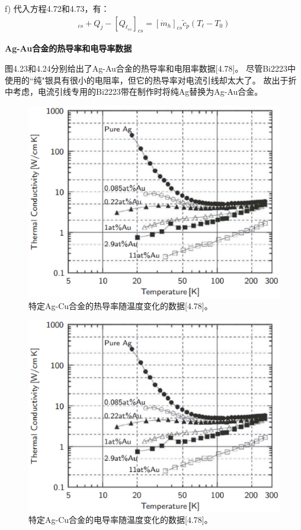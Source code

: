 f) 代入方程4.72和4.73，有：
\begin{align*}%
[Q_\ell]_{cs}+Q_j-[Q_{\ell_{cs}}]_{cs}=[\dot{m}_h]_{cs}\tilde{c}_p(T_\ell-T_0) \tag{4.74}
\end{align*}

\textbf{Ag-Au合金的热导率和电导率数据}

图4.23和4.24分别给出了Ag-Au合金的热导率和电阻率数据[4.78]。
尽管Bi2223中使用的``纯"银具有很小的电阻率，但它的热导率对电流引线却太大了。
故出于折中考虑，电流引线专用的Bi2223带在制作时将纯Ag替换为Ag-Au合金。

\begin{figure}[htbp]
	\centering
	\includegraphics[scale=0.7]{chpt4/figs/fig4.23.eps}
	\caption{特定Ag-Cu合金的热导率随温度变化的数据[4.78]。}
\end{figure}
\begin{figure}[htbp]
	\centering
	\includegraphics[scale=0.7]{chpt4/figs/fig4.23.eps}
	\caption{特定Ag-Cu合金的电导率随温度变化的数据[4.78]。}
\end{figure}

